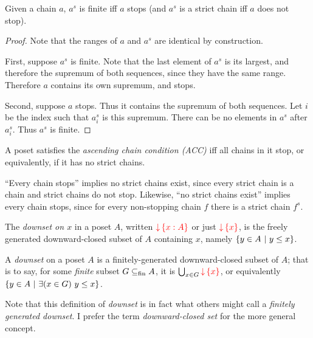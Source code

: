 \documentclass{article}
\begin{document}
\begin{lemma}
  Given a chain $a$, $a^s$ is finite iff $a$ stops (and $a^s$ is a strict chain
  iff $a$ does not stop).
\end{lemma}
\begin{proof}
  Note that the ranges of $a$ and $a^s$ are identical by construction.

  First, suppose $a^s$ is finite. Note that the last element of $a^s$ is its
  largest, and therefore the supremum of both sequences, since they have the
  same range. Therefore $a$ contains its own supremum, and stops.

  Second, suppose $a$ stops. Thus it contains the supremum of both sequences.
  Let $i$ be the index such that $a^s_i$ is this supremum. There can be no
  elements in $a^s$ after $a^s_i$. Thus $a^s$ is finite.
\end{proof}

\begin{definition}[ACC]
  A poset satisfies the \emph{ascending chain condition (ACC)} iff all chains in
  it stop, or equivalently, if it has no strict chains.
\end{definition}

``Every chain stops'' implies no strict chains exist, since every strict chain
is a chain and strict chains do not stop. Likewise, ``no strict chains exist''
implies every chain stops, since for every non-stopping chain $f$ there is a
strict chain $f^s$.


\begin{definition}
  The \emph{downset on $x$} in a poset $A$, written $\downintro{x : A}$ or just
  $\downintro{x}$, is the freely generated downward-closed subset of $A$
  containing $x$, namely $\{{{y \in A}~|~{y \le x}}\}$.
\end{definition}

\begin{definition}[Downset]
  A \emph{downset} on a poset $A$ is a finitely-generated downward-closed subset
  of $A$; that is to say, for some \emph{finite} subset $G \subseteq_{\text{fin}} A$, it
  is $\bigcup_{x \in G} \downintro{x}$, or equivalently $\{{{y \in
    A}~|~{\exists(x \in G)\ y \le x}}\}$.
\end{definition}

Note that this definition of \emph{downset} is in fact what others might call a
\emph{finitely generated downset}. I prefer the term \emph{downward-closed set}
for the more general concept.
\end{document}
